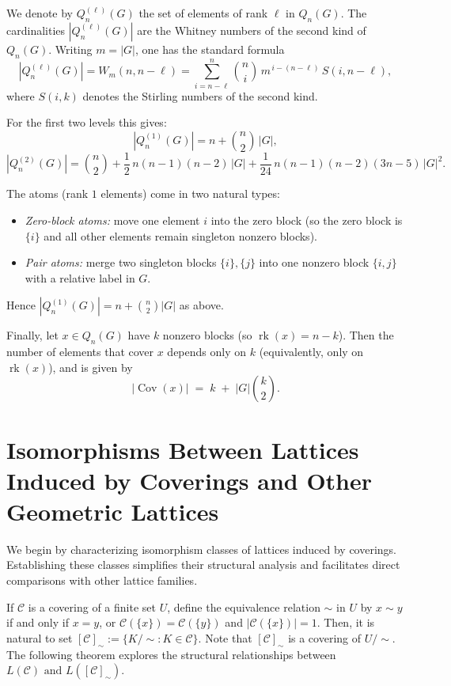 \documentclass{article}
\begin{document}
We denote by \(Q_n^{(\ell)}(G)\) the set of elements of rank \(\ell\) in \(Q_n(G)\).
The cardinalities \(|Q_n^{(\ell)}(G)|\) are the Whitney numbers of the second kind of
\(Q_n(G)\). Writing \(m=|G|\), one has the standard formula \citep{Dowling1973}
\[
|Q_n^{(\ell)}(G)|
=
W_m(n,n-\ell)
=
\sum_{i=n-\ell}^{n}\binom{n}{i}\,m^{\,i-(n-\ell)}\,S(i,n-\ell),
\]
where \(S(i,k)\) denotes the Stirling numbers of the second kind.

For the first two levels this gives:
\[
|Q_n^{(1)}(G)| = n + \binom{n}{2}\,|G|,
\]
\[
|Q_n^{(2)}(G)|
= \binom{n}{2}
+ \frac12\,n(n-1)(n-2)\,|G|
+ \frac{1}{24}\,n(n-1)(n-2)(3n-5)\,|G|^2.
\]

The atoms (rank \(1\) elements) come in two natural types:
\begin{itemize}
\item \emph{Zero-block atoms:} move one element \(i\) into the zero block (so the zero block is \(\{i\}\) and all other elements remain singleton nonzero blocks).
\item \emph{Pair atoms:} merge two singleton blocks \(\{i\},\{j\}\) into one nonzero block \(\{i,j\}\) with a relative label in \(G\).
\end{itemize}
Hence \(|Q_n^{(1)}(G)| = n + \binom{n}{2}|G|\) as above.

\medskip
Finally, let \(x\in Q_n(G)\) have \(k\) nonzero blocks (so \(\operatorname{rk}(x)=n-k\)).
Then the number of elements that cover \(x\) depends only on \(k\) (equivalently, only on
\(\operatorname{rk}(x)\)), and is given by
\[
|\operatorname{Cov}(x)| \;=\; k \;+\; |G|\binom{k}{2}.
\]

\section{Isomorphisms Between Lattices Induced by Coverings and Other Geometric Lattices}

    
We begin by characterizing isomorphism classes of lattices induced by coverings. Establishing these classes simplifies their structural analysis and facilitates direct comparisons with other lattice families.

If \(\mathcal{C}\) is a covering of a finite set \(U\), define the equivalence relation $\sim$ in $U$ by $x \sim y$ if and only if $x=y$, or $\mathcal{C}(\{x\}) = \mathcal{C}(\{y\})$ and $|\mathcal{C}(\{x\})| = 1$. Then, it is natural to set $[\mathcal{C}]_{\sim} := \{K/{\sim}: K \in \mathcal{C}\}$. Note that $[\mathcal{C}]_{\sim}$ is a covering of $U/{\sim}$. The following theorem explores the structural relationships between $L(\mathcal{C}) \text{ and } L([\mathcal{C}]_{\sim})$. 
\end{document}
